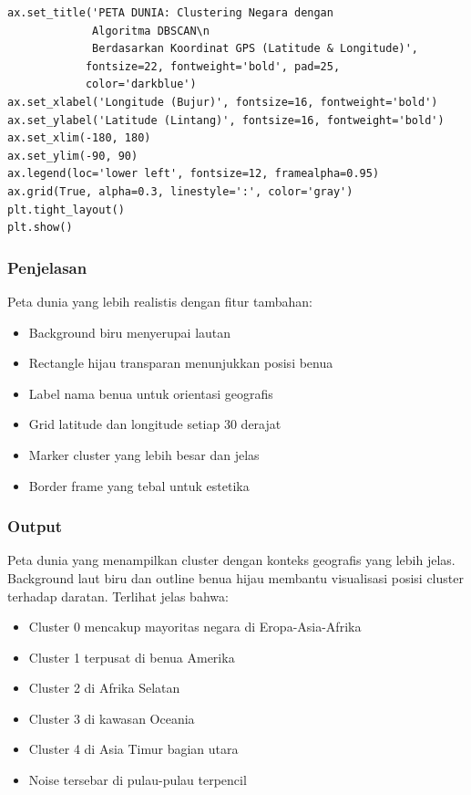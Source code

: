 \documentclass[12pt,a4paper]{article}
\begin{document}
\begin{lstlisting}[style=pythonstyle]
ax.set_title('PETA DUNIA: Clustering Negara dengan 
             Algoritma DBSCAN\n
             Berdasarkan Koordinat GPS (Latitude & Longitude)', 
            fontsize=22, fontweight='bold', pad=25, 
            color='darkblue')
ax.set_xlabel('Longitude (Bujur)', fontsize=16, fontweight='bold')
ax.set_ylabel('Latitude (Lintang)', fontsize=16, fontweight='bold')
ax.set_xlim(-180, 180)
ax.set_ylim(-90, 90)
ax.legend(loc='lower left', fontsize=12, framealpha=0.95)
ax.grid(True, alpha=0.3, linestyle=':', color='gray')
plt.tight_layout()
plt.show()
\end{lstlisting}

\subsubsection{Penjelasan}
Peta dunia yang lebih realistis dengan fitur tambahan:
\begin{itemize}
    \item Background biru menyerupai lautan
    \item Rectangle hijau transparan menunjukkan posisi benua
    \item Label nama benua untuk orientasi geografis
    \item Grid latitude dan longitude setiap 30 derajat
    \item Marker cluster yang lebih besar dan jelas
    \item Border frame yang tebal untuk estetika
\end{itemize}

\subsubsection{Output}
Peta dunia yang menampilkan cluster dengan konteks geografis yang lebih jelas. Background laut biru dan outline benua hijau membantu visualisasi posisi cluster terhadap daratan. Terlihat jelas bahwa:
\begin{itemize}
    \item Cluster 0 mencakup mayoritas negara di Eropa-Asia-Afrika
    \item Cluster 1 terpusat di benua Amerika
    \item Cluster 2 di Afrika Selatan
    \item Cluster 3 di kawasan Oceania
    \item Cluster 4 di Asia Timur bagian utara
    \item Noise tersebar di pulau-pulau terpencil
\end{itemize}
\end{document}

